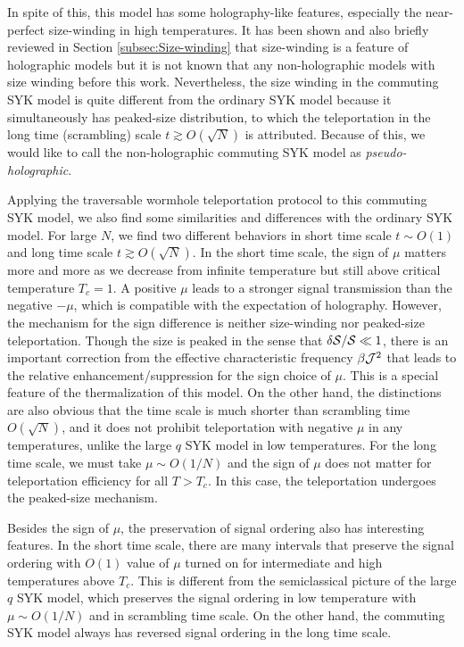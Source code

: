 \documentclass[11pt]{article}
\renewcommand{\>}{\rangle}
\newcommand{\<}{\langle}
\begin{document}
In spite of this, this model has some holography-like features, especially
the near-perfect size-winding in high temperatures. It has been shown
 and also briefly reviewed in Section \ref{subsec:Size-winding}
that size-winding is a feature of holographic models but it is not
known that any non-holographic models with size winding before this
work. Nevertheless, the size winding in the commuting SYK model is
quite different from the ordinary SYK model because it simultaneously
has peaked-size distribution, to which the teleportation in the long time
(scrambling) scale $t\gtrsim O(\sqrt{N})$ is attributed. Because
of this, we would like to call the non-holographic commuting SYK model
as \textit{pseudo-holographic}.

Applying the traversable wormhole teleportation protocol to this commuting
SYK model, we also find some similarities and differences with the
ordinary SYK model. For large $N$, we find two different behaviors
in short time scale $t\sim O(1)$ and long time scale $t\gtrsim O(\sqrt{N})$.
In the short time scale, the sign of $\mu$ matters more and more as we decrease from infinite temperature but still above critical temperature $T_c=1$. A positive $\mu$ leads to a stronger signal
transmission than the negative $-\mu$, which is compatible with
the expectation of holography. However, the mechanism for the sign difference is neither size-winding nor peaked-size teleportation. Though the size is peaked in the sense that $\delta \mathcal{S}/\mathcal{S}\ll 1$, there is an important correction from the effective characteristic frequency $\beta \mathcal{J}^2$ that leads to the relative enhancement/suppression for the sign choice of $\mu$. This is a special feature of the thermalization of this model. On
the other hand, the distinctions are also obvious that the time scale
is much shorter than scrambling time $O(\sqrt{N})$, and it does not
prohibit teleportation with negative $\mu$ in any temperatures, unlike
the large $q$ SYK model in low temperatures. For the long time scale,
we must take $\mu\sim O(1/N)$ and the sign of $\mu$ does not matter
for teleportation efficiency for all $T>T_c$. In this case, the teleportation undergoes the peaked-size mechanism.

Besides the sign of $\mu$, the preservation of signal ordering also
has interesting features. In the short time scale, there are many
intervals that preserve the signal ordering with $O(1)$ value of
$\mu$ turned on for intermediate and high temperatures above $T_c$. This is different
from the semiclassical picture of the large $q$ SYK model, which preserves
the signal ordering in low temperature with $\mu\sim O(1/N)$ and
in scrambling time scale. On the other hand, the commuting SYK model
always has reversed signal ordering in the long time scale. 
\end{document}

